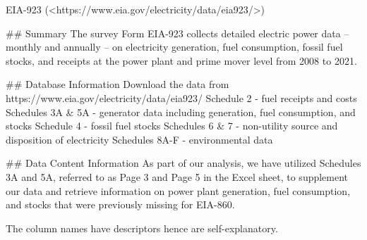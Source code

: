 EIA-923 (<https://www.eia.gov/electricity/data/eia923/>)

## Summary
The survey Form EIA-923 collects detailed electric power data -- monthly and annually -- on electricity generation, fuel consumption, fossil fuel stocks, and receipts at the power plant and prime mover level from 2008 to 2021.

## Database Information
Download the data from https://www.eia.gov/electricity/data/eia923/
Schedule 2 - fuel receipts and costs
Schedules 3A & 5A - generator data including generation, fuel consumption, and stocks
Schedule 4 - fossil fuel stocks
Schedules 6 & 7 - non-utility source and disposition of electricity
Schedules 8A-F - environmental data


## Data Content Information
As part of our analysis, we have utilized Schedules 3A and 5A, referred to as Page 3 and Page 5 in the Excel sheet, to supplement our data and retrieve information on power plant generation, fuel consumption, and stocks that were previously missing for EIA-860. 

The column names have descriptors hence are self-explanatory.

